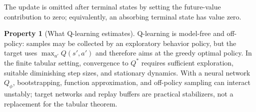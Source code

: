\documentclass[11pt,a4paper]{article}
\theoremstyle{definition}
\newtheorem{property}[definition]{Property}
\begin{document}
The update is omitted after terminal states by setting the future-value contribution to
zero; equivalently, an absorbing terminal state has value zero.

\begin{property}[What Q-learning estimates]
Q-learning is model-free and off-policy: samples may be collected by an exploratory
behavior policy, but the target uses $\max_{a'}Q(s',a')$ and therefore aims at the greedy
optimal policy. In the finite tabular setting, convergence to $Q^*$ requires sufficient
exploration, suitable diminishing step sizes, and stationary dynamics. With a neural
network $Q_\phi$, bootstrapping, function approximation, and off-policy sampling can
interact unstably; target networks and replay buffers are practical stabilizers, not a
replacement for the tabular theorem.
\end{property}
\end{document}
